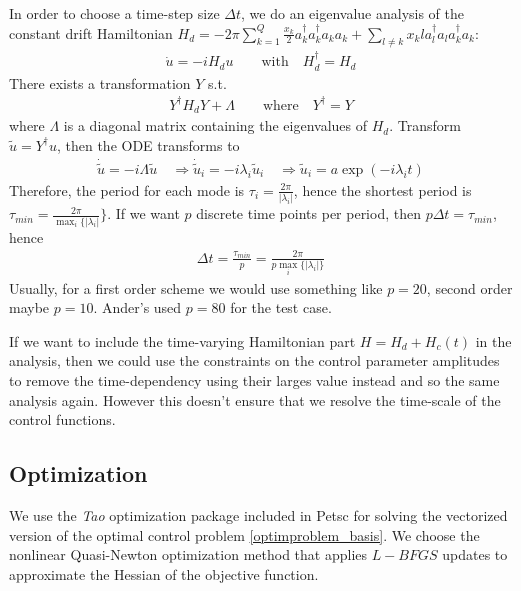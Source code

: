 \documentclass[letterpaper]{article}
\begin{document}
    In order to choose a time-step size $\Delta t$, we do an eigenvalue analysis of the constant drift Hamiltonian $H_d =  -2\pi \sum_{k=1}^Q \frac{x_k}{2} a_k^{\dagger}a_k^{\dagger}a_ka_k + \sum_{l\neq k} x_kl a_l^{\dagger}a_l a_k^{\dagger}a_k$:
       \begin{align*}  
         \dot u = -i H_d u \qquad \text{with} \quad H_d^{\dagger}  = H_d
       \end{align*} 
       There exists a transformation $Y$ s.t. 
       \begin{align*}
         Y^{\dagger}H_d Y + \Lambda \qquad  \text{where} \quad Y^{\dagger} = Y
       \end{align*}
       where $\Lambda$ is a diagonal matrix containing the eigenvalues of $H_d$. Transform $\tilde u = Y^{\dagger} u$, then the ODE transforms to 
       \begin{align*}
         \dot \tilde u = -i \Lambda \tilde u \quad \Rightarrow \dot \tilde u_i = -i\lambda_i \tilde u_i \quad \Rightarrow \tilde u_i = a \exp(-i\lambda_i t)
       \end{align*}
       Therefore, the period for each mode is $\tau_i = \frac{2\pi}{|\lambda_i|}$, hence the shortest period is $\tau_{min} = \frac{2\pi}{\max_i\{|\lambda_i|}\}$. If we want $p$ discrete time points per period, then $p\Delta t = \tau_{min}$, hence 
       \begin{align*}
         \Delta t = \frac{\tau_{min}}{p} = \frac{2\pi}{p\max_i\{|\lambda_i|\}}
       \end{align*}
       Usually, for a first order scheme we would use something like $p=20$, second order maybe $p=10$. Ander's used $p=80$ for the test case. 

       If we want to include the time-varying Hamiltonian part $H = H_d + H_c(t)$ in the analysis, then we could use the constraints on the control parameter amplitudes to remove the time-dependency using their larges value instead and so the same analysis again. However this doesn't ensure that we resolve the time-scale of the control functions. 

  \subsection{Optimization}
    We use the \textit{Tao} optimization package included in Petsc for solving the vectorized version of the optimal control problem \eqref{optimproblem_basis}. We choose the nonlinear Quasi-Newton optimization method that applies $L-BFGS$ updates to approximate the Hessian of the objective function. 
\end{document}
